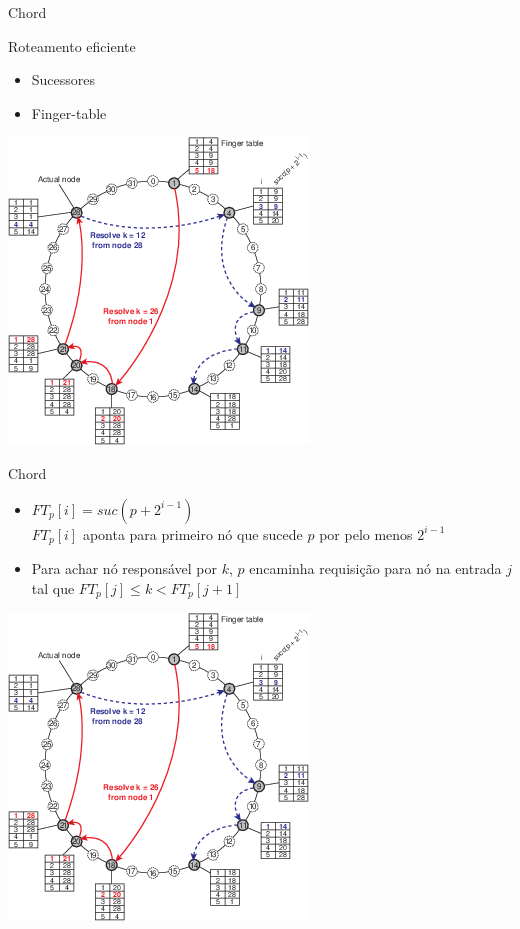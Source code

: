 \begin{frame}{Chord}
\begin{beamerboxesrounded}{Roteamento eficiente}
	\begin{itemize}
		\item Sucessores
		\item Finger-table
	\end{itemize}
\end{beamerboxesrounded}

\includegraphics[width=.45\textwidth]{images/05-04}	
\end{frame}

\begin{frame}{Chord}
\begin{itemize}
	\item $FT_p[i] = suc(p+2^{i-1})$\\
	$FT_p[i]$ aponta para primeiro nó que sucede $p$ por pelo menos $ 2^{i-1}$
	\item Para achar nó responsável por $k$, $p$ encaminha requisição para nó na entrada $j$ tal que $FT_p[j] \leq k < FT_p[j + 1]$
\end{itemize}

\includegraphics[width=.45\textwidth]{images/05-04}	
\end{frame}

